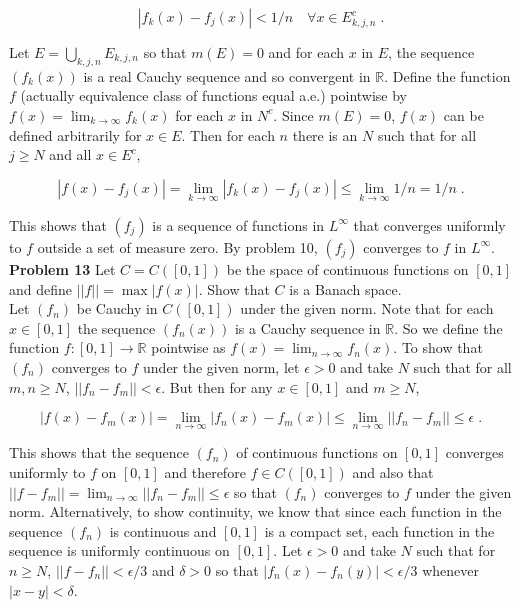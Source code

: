 \documentclass[a4paper]{article}
\begin{document}
$$|f_k(x) - f_j(x)| < 1/n \quad \forall x \in E_{k,j,n}^c \;.$$

Let $E = \bigcup_{k,j,n} E_{k,j,n}$ so that $m(E) = 0$ and for each $x$ in $E$, the sequence $(f_k(x))$ is a real Cauchy sequence and so convergent in $\mathbb{R}$. Define the function $f$ (actually equivalence class of functions equal a.e.) pointwise by $f(x) = \lim_{k\rightarrow \infty} f_k(x)$ for each $x$ in $N^c$. Since $m(E) = 0$, $f(x)$ can be defined arbitrarily for $x \in E$. Then for each $n$ there is an $N$ such that for all $j \geq N$ and all $x \in E^c$,

$$|f(x) - f_j(x)|  = \lim_{k\rightarrow \infty} |f_k(x) - f_j(x)| \leq \lim_{k\rightarrow \infty} 1/n = 1/n \;.$$

This shows that $(f_j)$ is a sequence of functions in $L^\infty$ that converges uniformly to $f$ outside a set of measure zero. By problem 10, $(f_j)$ converges to $f$ in $L^\infty$.\\

{\bf Problem 13} Let $C = C([0,1])$ be the space of continuous functions on $[0,1]$ and define $||f|| = \max |f(x)|$. Show that $C$ is a Banach space. \\

Let $(f_n)$ be Cauchy in $C([0,1])$ under the given norm. Note that for each $x \in [0,1]$ the sequence $(f_n(x))$ is a Cauchy sequence in $\mathbb{R}$. So we define the function $f : [0,1] \rightarrow \mathbb{R}$ pointwise as $f(x) = \lim_{n\rightarrow \infty} f_n(x)$. To show that $(f_n)$ converges to $f$ under the given norm, let $\epsilon > 0$ and take $N$ such that for all $m,n \geq N$, $||f_n - f_m|| < \epsilon$. But then for any $x \in [0,1]$ and $m \geq N$,

$$|f(x) - f_m(x)| = \lim_{n\rightarrow \infty} |f_n(x) - f_m(x)| \leq \lim_{n\rightarrow \infty} ||f_n - f_m|| \leq \epsilon \;.$$

This shows that the sequence $(f_n)$ of continuous functions on $[0,1]$ converges uniformly to $f$ on $[0,1]$ and therefore $f \in C([0,1])$ and also that $||f - f_m|| = \lim_{n\rightarrow \infty } ||f_n - f_m|| \leq \epsilon$ so that $(f_n)$ converges to $f$ under the given norm. Alternatively, to show continuity, we know that since each function in the sequence $(f_n)$ is continuous and $[0,1]$ is a compact set, each function in the sequence is uniformly continuous on $[0,1]$. Let $\epsilon >0 $ and take $N$ such that for $n \geq N$, $||f-f_n|| < \epsilon/3$ and $\delta > 0$ so that $|f_n(x) - f_n(y)| < \epsilon /3$ whenever $|x - y| < \delta$. 
\end{document}
